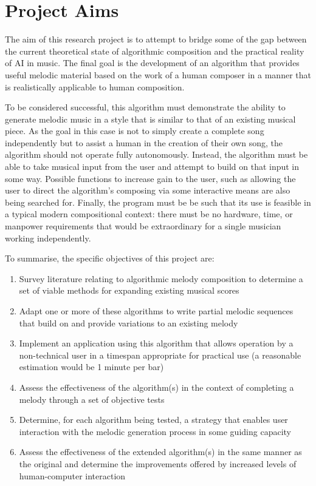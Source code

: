 \documentclass[ author={Stephen Livermore-Tozer},
				supervisor={Dr. Peter Flach},
				degree={MEng},
				title={Algorithmic Co-composition Using Machine Learning},
				subtitle={},
				type={research},
				year={2016} ]{dissertation}
\begin{document}
	\section{Project Aims}
	\label{sec:project-aims}
	
	The aim of this research project is to attempt to bridge some of the gap between the current theoretical state of algorithmic composition and the practical reality of AI in music. The final goal is the development of an algorithm that provides useful melodic material based on the work of a human composer in a manner that is realistically applicable to human composition.
	
	To be considered successful, this algorithm must demonstrate the ability to generate melodic music in a style that is similar to that of an existing musical piece. As the goal in this case is not to simply create a complete song independently but to assist a human in the creation of their own song, the algorithm should not operate fully autonomously. Instead, the algorithm must be able to take musical input from the user and attempt to build on that input in some way. Possible functions to increase gain to the user, such as allowing the user to direct the algorithm's composing via some interactive means are also being searched for. Finally, the program must be be such that its use is feasible in a typical modern compositional context: there must be no hardware, time, or manpower requirements that would be extraordinary for a single musician working independently.
	
	To summarise, the specific objectives of this project are:
	\begin{enumerate}
		\item Survey literature relating to algorithmic melody composition to determine a set of viable methods for expanding existing musical scores
		\item Adapt one or more of these algorithms to write partial melodic sequences that build on and provide variations to an existing melody
		\item Implement an application using this algorithm that allows operation by a non-technical user in a timespan appropriate for practical use (a reasonable estimation would be 1 minute per bar)
		\item Assess the effectiveness of the algorithm(s) in the context of completing a melody through a set of objective tests
		\item Determine, for each algorithm being tested, a strategy that enables user interaction with the melodic generation process in some guiding capacity
		\item Assess the effectiveness of the extended algorithm(s) in the same manner as the original and determine the improvements offered by increased levels of human-computer interaction
	\end{enumerate}
	
\end{document}

